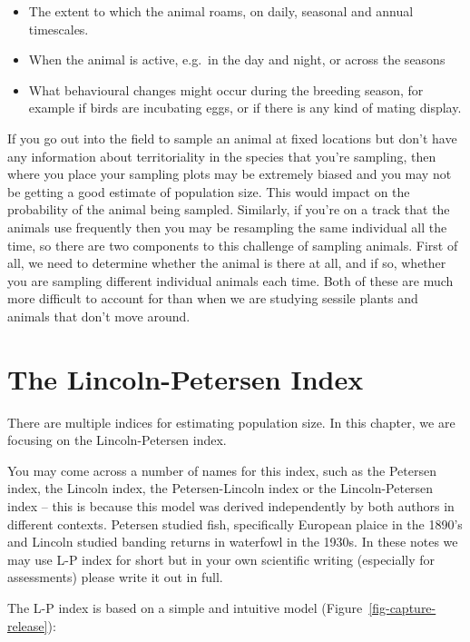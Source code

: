 \documentclass[
  letterpaper,
  DIV=11,
  numbers=noendperiod]{scrreprt}
\providecommand{\tightlist}{%
  \setlength{\itemsep}{0pt}\setlength{\parskip}{0pt}}
\begin{document}
\begin{itemize}
\tightlist
\item
  The extent to which the animal roams, on daily, seasonal and annual
  timescales.
\item
  When the animal is active, e.g.~in the day and night, or across the
  seasons
\item
  What behavioural changes might occur during the breeding season, for
  example if birds are incubating eggs, or if there is any kind of
  mating display.
\end{itemize}

If you go out into the field to sample an animal at fixed locations but
don't have any information about territoriality in the species that
you're sampling, then where you place your sampling plots may be
extremely biased and you may not be getting a good estimate of
population size. This would impact on the probability of the animal
being sampled. Similarly, if you're on a track that the animals use
frequently then you may be resampling the same individual all the time,
so there are two components to this challenge of sampling animals. First
of all, we need to determine whether the animal is there at all, and if
so, whether you are sampling different individual animals each time.
Both of these are much more difficult to account for than when we are
studying sessile plants and animals that don't move around.

\section{The Lincoln-Petersen Index}\label{the-lincoln-petersen-index}

There are multiple indices for estimating population size. In this
chapter, we are focusing on the Lincoln-Petersen index.

You may come across a number of names for this index, such as the
Petersen index, the Lincoln index, the Petersen-Lincoln index or the
Lincoln-Petersen index -- this is because this model was derived
independently by both authors in different contexts. Petersen studied
fish, specifically European plaice in the 1890's and Lincoln studied
banding returns in waterfowl in the 1930s. In these notes we may use L-P
index for short but in your own scientific writing (especially for
assessments) please write it out in full.

The L-P index is based on a simple and intuitive model
(Figure~\ref{fig-capture-release}):
\end{document}
